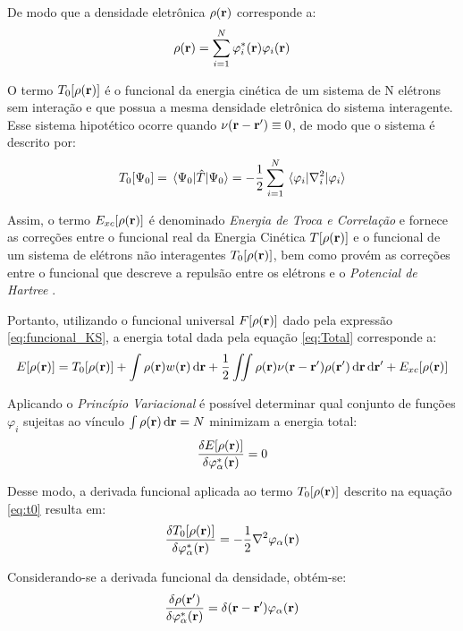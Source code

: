 De modo que a densidade eletrônica $ \rho(\vb{r}) $ corresponde a:
\begin{equation}\label{eq:densi}
	\rho(\vb{r})= \sum_{i=1}^{N}\varphi_i^{\ast}(\vb{r})\varphi_i(\vb{r})
\end{equation}

O termo $ T_0\bqty{\dens} $ é o funcional da energia cinética de um sistema de N elétrons sem interação e que possua a mesma densidade eletrônica do sistema interagente. Esse sistema hipotético ocorre quando $ \nu({\vb{r}-\vb{r'}})\equiv 0 $, de modo que o sistema é descrito por:
\begin{equation}\label{eq:t0}
	T_0\bqty{\Psi_0}=\ev{\hat{T}}{\Psi_0}=-\frac{1}{2}\sum_{i=1}^{N}\ev{\laplacian_i}{\varphi_{i}}
\end{equation} 

Assim, o termo $ E_{xc}\bqty{\dens} $ é denominado \textit{Energia de Troca e Correlação} e fornece as correções entre o funcional real da Energia Cinética $ T\bqty{\dens} $ e o funcional de um sistema de elétrons não interagentes $  T_0\bqty{\dens}  $, bem como provém as correções entre o funcional que descreve a repulsão entre os elétrons e o \textit{Potencial de Hartree} \cite{rev_dft}.

Portanto, utilizando o funcional universal $ F\bqty{\dens} $ dado pela expressão \eqref{eq:funcional_KS}, a energia total dada pela equação \eqref{eq:Total} corresponde a:
\begin{equation}
	E\bqty{\dens}=T_0\bqty{\dens}+\int\dens w(\vb{r})\dr + \frac{1}{2}\iint \dens\nu({\vb{r}-\vb{r'}})\denslinha \dr \drlinha + E_{xc}\bqty{\dens}
\end{equation}

Aplicando o \textit{Princípio Variacional} é possível determinar qual conjunto de funções $ \varphi_{i} $ sujeitas ao vínculo $ \int \rho(\vb{r}) \dd{\vb{r}}=N $ minimizam a energia total:
\begin{equation}\label{eq:variacional}
	\fdv{E\bqty{\dens}}{\phialfac}=0
\end{equation}

Desse modo, a derivada funcional aplicada ao termo $ T_0\bqty{\dens} $ descrito na equação \eqref{eq:t0} resulta em:
\begin{equation}
	\fdv{T_0\bqty{\dens}}{\phialfac}=-\frac{1}{2}\laplacian{\varphi_{\alpha}(\vb{r})}
\end{equation}

Considerando-se a derivada funcional da densidade, obtém-se:
\begin{equation}
	\fdv{\denslinha}{\phialfac}=\delta(\vb{r}-\vb{r'})\phialfa
\end{equation}

